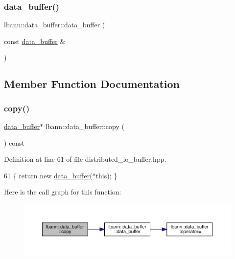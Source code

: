 \subsubsection{\texorpdfstring{data\+\_\+buffer()}{data\_buffer()}\hspace{0.1cm}{\footnotesize\ttfamily [2/2]}}
{\footnotesize\ttfamily lbann\+::data\+\_\+buffer\+::data\+\_\+buffer (\begin{DoxyParamCaption}\item[{const \hyperlink{classlbann_1_1data__buffer}{data\+\_\+buffer} \&}]{ }\end{DoxyParamCaption})\hspace{0.3cm}{\ttfamily [default]}}



\subsection{Member Function Documentation}
\mbox{\label{classlbann_1_1data__buffer_acd96a02a4709efe967f34cd004d742b5}} 
\subsubsection{\texorpdfstring{copy()}{copy()}}
{\footnotesize\ttfamily \hyperlink{classlbann_1_1data__buffer}{data\+\_\+buffer}$\ast$ lbann\+::data\+\_\+buffer\+::copy (\begin{DoxyParamCaption}{ }\end{DoxyParamCaption}) const\hspace{0.3cm}{\ttfamily [inline]}}



Definition at line 61 of file distributed\+\_\+io\+\_\+buffer.\+hpp.


\begin{DoxyCode}
61 \{ \textcolor{keywordflow}{return} \textcolor{keyword}{new} \hyperlink{classlbann_1_1data__buffer_ad03198df8b35ac6349180d5b2bc036d5}{data\_buffer}(*\textcolor{keyword}{this}); \}
\end{DoxyCode}
Here is the call graph for this function\+:\nopagebreak
\begin{figure}[H]
\begin{center}
\leavevmode
\includegraphics[width=350pt]{classlbann_1_1data__buffer_acd96a02a4709efe967f34cd004d742b5_cgraph}
\end{center}
\end{figure}
\mbox{\label{classlbann_1_1data__buffer_a364283f9ce3d811ec73fc3c2513f11a6}} 

